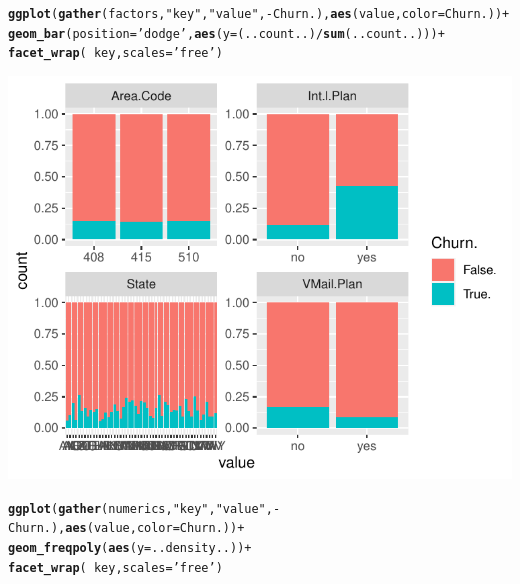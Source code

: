 \documentclass{article}\usepackage[]{graphicx}\usepackage[]{color}
\makeatletter
\def\maxwidth{ %
  \ifdim\Gin@nat@width>\linewidth
    \linewidth
  \else
    \Gin@nat@width
  \fi
}
\newcommand{\hlstr}[1]{\textcolor[rgb]{0.192,0.494,0.8}{#1}}%
\newcommand{\hlopt}[1]{\textcolor[rgb]{0,0,0}{#1}}%
\newcommand{\hlstd}[1]{\textcolor[rgb]{0.345,0.345,0.345}{#1}}%
\newcommand{\hlkwc}[1]{\textcolor[rgb]{0.333,0.667,0.333}{#1}}%
\newcommand{\hlkwd}[1]{\textcolor[rgb]{0.737,0.353,0.396}{\textbf{#1}}}%
\newenvironment{kframe}{%
 \def\at@end@of@kframe{}%
 \ifinner\ifhmode%
  \def\at@end@of@kframe{\end{minipage}}%
  \begin{minipage}{\columnwidth}%
 \fi\fi%
 \def\FrameCommand##1{\hskip\@totalleftmargin \hskip-\fboxsep
 \colorbox{shadecolor}{##1}\hskip-\fboxsep
     \hskip-\linewidth \hskip-\@totalleftmargin \hskip\columnwidth}%
 \MakeFramed {\advance\hsize-\width
   \@totalleftmargin\z@ \linewidth\hsize
   \@setminipage}}%
 {\par\unskip\endMakeFramed%
 \at@end@of@kframe}
\newenvironment{knitrout}{}{} %
\makeatother
\begin{document}
\begin{description}
\begin{knitrout}
\color{fgcolor}\begin{kframe}
\begin{alltt}
\hlkwd{ggplot}\hlstd{(}\hlkwd{gather}\hlstd{(factors,} \hlstr{"key"}\hlstd{,} \hlstr{"value"}\hlstd{,} \hlopt{-}\hlstd{Churn.),} \hlkwd{aes}\hlstd{(value,} \hlkwc{color}\hlstd{=Churn.))} \hlopt{+}
  \hlkwd{geom_bar}\hlstd{(}\hlkwc{position}\hlstd{=}\hlstr{'dodge'}\hlstd{,} \hlkwd{aes}\hlstd{(}\hlkwc{y}\hlstd{=(..count..)}\hlopt{/}\hlkwd{sum}\hlstd{(..count..)))} \hlopt{+}
  \hlkwd{facet_wrap}\hlstd{(}\hlopt{~}\hlstd{key,} \hlkwc{scales}\hlstd{=}\hlstr{'free'}\hlstd{)}
\end{alltt}
\end{kframe}
\includegraphics[width=\maxwidth]{figure/Overviews_plots_grouped-1} 
\begin{kframe}\begin{alltt}
\hlkwd{ggplot}\hlstd{(}\hlkwd{gather}\hlstd{(numerics,} \hlstr{"key"}\hlstd{,} \hlstr{"value"}\hlstd{,} \hlopt{-}\hlstd{Churn.),} \hlkwd{aes}\hlstd{(value,} \hlkwc{color}\hlstd{=Churn.))} \hlopt{+}
  \hlkwd{geom_freqpoly}\hlstd{(}\hlkwd{aes}\hlstd{(}\hlkwc{y}\hlstd{=..density..))} \hlopt{+}
  \hlkwd{facet_wrap}\hlstd{(}\hlopt{~}\hlstd{key,} \hlkwc{scales}\hlstd{=}\hlstr{'free'}\hlstd{)}
\end{alltt}
\end{kframe}

\end{knitrout}
\end{description}
\end{document}
